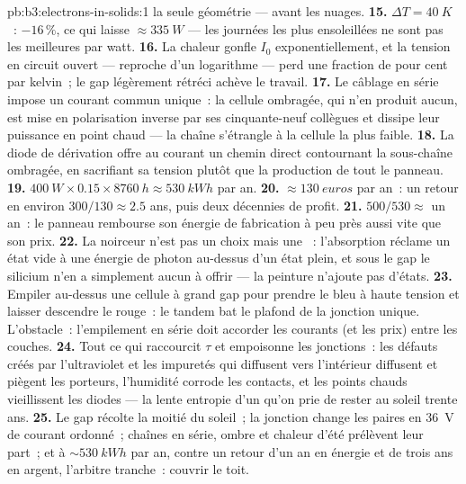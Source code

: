 \begin{solution}{pb:b3:electrons-in-solids:1}
la seule géométrie --- avant les nuages.
\textbf{15.} $\Delta T = \qty{40}{K}$~: $-16\,\%$, ce qui laisse
$\approx\qty{335}{W}$ --- les journées les plus ensoleillées ne sont
pas les meilleures par watt.
\textbf{16.} La chaleur gonfle $I_0$ exponentiellement, et la
tension en circuit ouvert --- reproche d'un logarithme --- perd une
fraction de pour cent par kelvin~; le gap légèrement rétréci achève
le travail.
\textbf{17.} Le câblage en série impose un courant commun unique~:
la cellule ombragée, qui n'en produit aucun, est mise en
polarisation inverse par ses cinquante-neuf collègues et dissipe
leur puissance en point chaud --- la chaîne s'étrangle à la cellule
la plus faible.
\textbf{18.} La diode de dérivation offre au courant un chemin
direct contournant la sous-chaîne ombragée, en sacrifiant sa tension
plutôt que la production de tout le panneau.
\textbf{19.} $\qty{400}{W}\times0.15\times\qty{8760}{h} \approx
\qty{530}{kWh}$ par an.
\textbf{20.} $\approx\qty{130}{euros}$ par an~: un retour en
environ $300/130 \approx 2.5$ ans, puis deux décennies de profit.
\textbf{21.} $500/530 \approx$ un an~: le panneau rembourse son
énergie de fabrication à peu près aussi vite que son prix.
\textbf{22.} La noirceur n'est pas un choix mais une ~: l'absorption réclame un état vide à une énergie de photon
au-dessus d'un état plein, et sous le gap le silicium n'en a
simplement aucun à offrir --- la peinture n'ajoute pas d'états.
\textbf{23.} Empiler au-dessus une cellule à grand gap pour prendre
le bleu à haute tension et laisser descendre le rouge~: le tandem
bat le plafond de la jonction unique. L'obstacle~: l'empilement en
série doit accorder les courants (et les prix) entre les couches.
\textbf{24.} Tout ce qui raccourcit $\tau$ et empoisonne les
jonctions~: les défauts créés par l'ultraviolet et les impuretés qui
diffusent vers l'intérieur diffusent et piègent les porteurs,
l'humidité corrode les contacts, et les points chauds vieillissent
les diodes --- la lente entropie d'un  qu'on prie de rester
au soleil trente ans.
\textbf{25.} Le gap récolte la moitié du soleil~; la jonction change
les paires en \qty{36}{V} de courant ordonné~; chaînes en série,
ombre et chaleur d'été prélèvent leur part~; et à
$\sim\qty{530}{kWh}$ par an, contre un retour d'un an en énergie et
de trois ans en argent, l'arbitre tranche~: couvrir le toit.
\end{solution}
